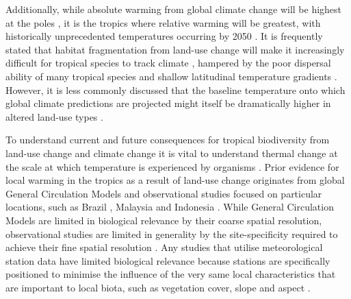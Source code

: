 \documentclass[12pt,a4paper,]{report}
\theoremstyle{definition}
\theoremstyle{definition}
\theoremstyle{definition}
\theoremstyle{remark}
\begin{document}
Additionally, while absolute warming from global climate change will be
highest at the poles \citep{ipcc_climate_2013}, it is the tropics where
relative warming will be greatest, with historically unprecedented
temperatures occurring by 2050 \citep{mora_projected_2013}. It is
frequently stated that habitat fragmentation from land-use change will
make it increasingly difficult for tropical species to track climate
\citep{brook_synergies_2008, scriven_protected_2015}, hampered by the
poor dispersal ability of many tropical species
\citep{van_houtan_dispersal_2007} and shallow latitudinal temperature
gradients \citep{colwell_global_2008}. However, it is less commonly
discussed that the baseline temperature onto which global climate
predictions are projected might itself be dramatically higher in altered
land-use types \citep{foster_establishing_2011, tuff_framework_2016}.

To understand current and future consequences for tropical biodiversity
from land-use change and climate change it is vital to understand
thermal change at the scale at which temperature is experienced by
organisms
\citep{wiens_matching_2010, gillingham_relative_2010, suggitt_habitat_2011}.
Prior evidence for local warming in the tropics as a result of land-use
change originates from global General Circulation Models
\citep{findell_modeled_2007, davin_climatic_2010, pielke_land_2011} and
observational studies focused on particular locations, such as Brazil
\citep{loarie_velocity_2009}, Malaysia \citep{luskin_microclimate_2011}
and Indonesia \citep{ramdani_local_2014}. While General Circulation
Models are limited in biological relevance by their coarse spatial
resolution, observational studies are limited in generality by the
site-specificity required to achieve their fine spatial resolution
\citep{li_local_2015}. Any studies that utilise meteorological station
data have limited biological relevance because stations are specifically
positioned to minimise the influence of the very same local
characteristics that are important to local biota, such as vegetation
cover, slope and aspect \citep{frenne_weather_2016}.
\end{document}
